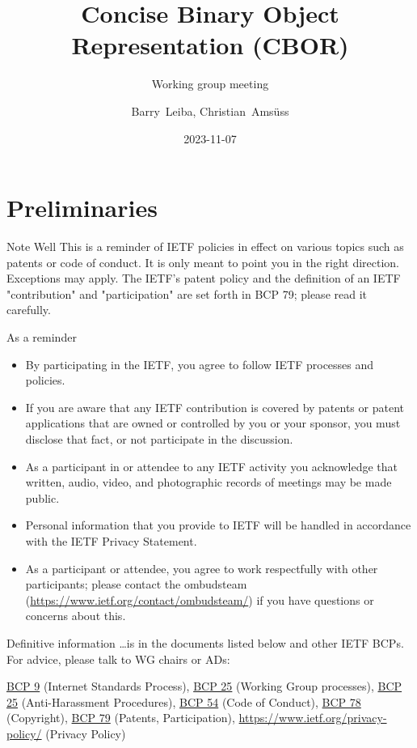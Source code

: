 \documentclass[aspectratio=169]{beamer}
\title{Concise Binary Object Representation (CBOR)}
\subtitle{Working group meeting}
\author{Barry~Leiba, Christian~Amsüss}
\institute{\normalsize{\theietf, Prague}}
\date{2023-11-07}
\begin{document}
\frame{\titlepage}

\section*{Preliminaries}

\begin{frame}{Note Well}\scriptsize
This is a reminder of IETF policies in effect on various topics such as patents or code of conduct. It is only meant to point you in the right direction. Exceptions may apply. The IETF's patent policy and the definition of an IETF "contribution" and "participation" are set forth in BCP 79; please read it carefully.

    \begin{block}{\small As a reminder\qquad\mbox{}}

    \vspace{-1.65em}

    \begin{itemize}
        \item By participating in the IETF, you agree to follow IETF processes and policies.
        \item If you are aware that any IETF contribution is covered by patents or patent applications that are owned or controlled by you or your sponsor, you must disclose that fact, or not participate in the discussion.
        \item As a participant in or attendee to any IETF activity you acknowledge that written, audio, video, and photographic records of meetings may be made public.
        \item Personal information that you provide to IETF will be handled in accordance with the IETF Privacy Statement.
        \item As a participant or attendee, you agree to work respectfully with other participants; please contact the ombudsteam (\url{https://www.ietf.org/contact/ombudsteam/}) if you have questions or concerns about this.
    \end{itemize}

    \end{block}

    \vspace{-1em}
    \begin{block}{\small Definitive information}
\ldots is in the documents listed below and other IETF BCPs. For advice, please talk to WG chairs or ADs:

\href{https://www.rfc-editor.org/info/bcp9}{BCP 9} (Internet Standards Process),
\href{https://www.rfc-editor.org/info/bcp25}{BCP 25} (Working Group processes),
\href{https://www.rfc-editor.org/info/bcp25}{BCP 25} (Anti-Harassment Procedures),
\href{https://www.rfc-editor.org/info/bcp54}{BCP 54} (Code of Conduct),
\href{https://www.rfc-editor.org/info/bcp78}{BCP 78} (Copyright),
\href{https://www.rfc-editor.org/info/bcp79}{BCP 79} (Patents, Participation),
\url{https://www.ietf.org/privacy-policy/} (Privacy Policy)
    \end{block}
\end{frame}
\end{document}
